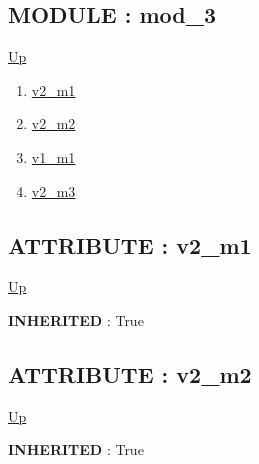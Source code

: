 \subsection*{MODULE : mod\_3}
\hypertarget{ecldoc:example_2.mod_3}{}
\par
\begin{minipage}[t]{\textwidth}
\begin{flushleft}
  
\end{flushleft}
\end{minipage}
\hyperlink{ecldoc:example_2}{Up} \\
\par
\par
\begin{enumerate}
\item \hyperlink{ecldoc:example_2.mod_1.v2_m1}{v2\_m1}
\item \hyperlink{ecldoc:example_2.mod_2.v2_m2}{v2\_m2}
\item \hyperlink{ecldoc:example_2.mod_3.v1_m1}{v1\_m1}
\item \hyperlink{ecldoc:example_2.mod_3.v2_m3}{v2\_m3}
\end{enumerate}
\subsection*{ATTRIBUTE : v2\_m1}
\hypertarget{ecldoc:example_2.mod_1.v2_m1}{}
\par
\begin{minipage}[t]{\textwidth}
\begin{flushleft}
  
\end{flushleft}
\end{minipage}
\hyperlink{ecldoc:example_2.mod_3}{Up} \\
\par
\par
\textbf{INHERITED} : True \\
\subsection*{ATTRIBUTE : v2\_m2}
\hypertarget{ecldoc:example_2.mod_2.v2_m2}{}
\par
\begin{minipage}[t]{\textwidth}
\begin{flushleft}
  
\end{flushleft}
\end{minipage}
\hyperlink{ecldoc:example_2.mod_3}{Up} \\
\par
\par
\textbf{INHERITED} : True \\
